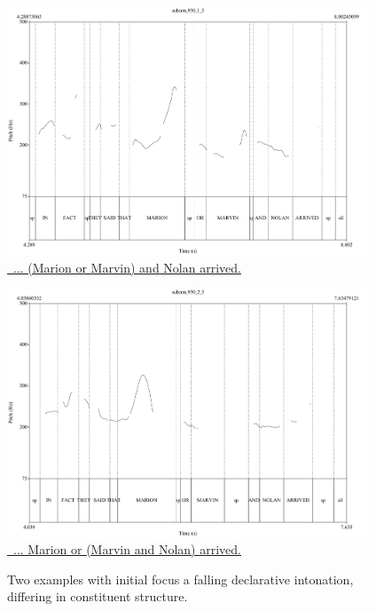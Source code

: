 \documentclass[preprint,review,12pt,authoryear,times]{elsarticle}
\begin{document}
\begin{figure}[ht!]
	\begin{center}
	\parbox{4.25in}{
	        \includegraphics[width=4.25in]{Figures/suborn_930_1_3.pdf}\ \\
	        \href{http://prosodylab.org/~chael/sounds/pape2017/suborn_930_1_3..wav}{\footnotesize\ ... (Marion or Marvin) and Nolan arrived.}
	        }
	        
	        \parbox{4.25in}{
	           \includegraphics[width=4.25in]{Figures/suborn_930_2_3.pdf}\ \\
	            \href{http://prosodylab.org/~chael/sounds/pape2017/suborn_930_2_3..wav}{\footnotesize \ ... Marion or (Marvin and Nolan) arrived.}
	            }
	            
		\caption{Two examples with initial focus a falling declarative intonation, differing in constituent structure.}
		\label{examm}
	\end{center}
\end{figure}	            
	         
\end{document}
